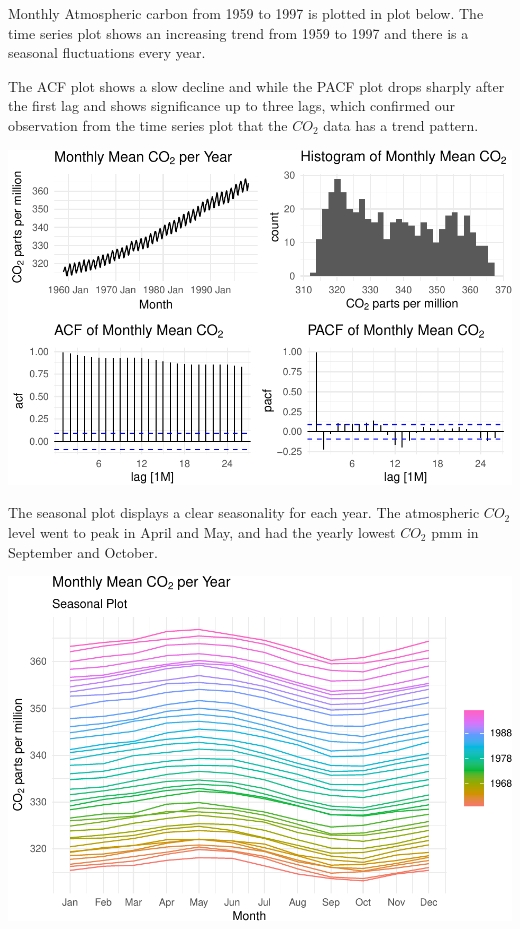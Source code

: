 \documentclass[AER]{AEA}
\begin{document}
Monthly Atmospheric carbon from 1959 to 1997 is plotted in plot below.
The time series plot shows an increasing trend from 1959 to 1997 and
there is a seasonal fluctuations every year.

The ACF plot shows a slow decline and while the PACF plot drops sharply
after the first lag and shows significance up to three lags, which
confirmed our observation from the time series plot that the \(CO_{2}\)
data has a trend pattern.

\includegraphics{co2_1997_Qian_files/figure-latex/EDA plots-1.pdf}

The seasonal plot displays a clear seasonality for each year. The
atmospheric \(CO_{2}\) level went to peak in April and May, and had the
yearly lowest \(CO_{2}\) pmm in September and October.

\includegraphics{co2_1997_Qian_files/figure-latex/seaonal grap-1.pdf}
\end{document}
